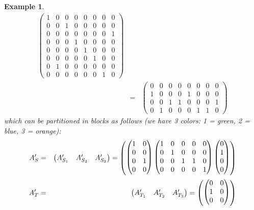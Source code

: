 \documentclass[a4paper,11pt]{report}
\newtheorem{example}[theorem]{Example}
\begin{document}
\begin{example}
\begin{eqnarray*}
\begin{pmatrix}
1&0&0&0&0&0&0&0\\
0&0&1&0&0&0&0&0\\
0&0&0&0&0&0&0&1\\
0&0&0&1&0&0&0&0\\
0&0&0&0&1&0&0&0\\
0&0&0&0&0&1&0&0\\
0&1&0&0&0&0&0&0\\
0&0&0&0&0&0&1&0
\end{pmatrix}\\  &=& \begin{pmatrix}
0&0&0&0&0&0&0&0\\
1&0&0&0&1&0&0&0\\
0&0&1&1&0&0&0&1\\
0&1&0&0&0&1&1&0
\end{pmatrix}
\end{eqnarray*}
which can be partitioned in blocks as follows (we have 3 colors: 1 = green, 2 = blue, 3 = orange):
\begin{eqnarray*}A'_S &=& \begin{pmatrix}
A'_{S_1} & A'_{S_2} & A'_{S_3}\\
\end{pmatrix} =
\begin{pmatrix}\smallskip
  \begin{pmatrix}
  1&0\\
0&0\\
0&1\\
0&0
\end{pmatrix}
\begin{pmatrix}
1&0&0&0&0\\
0&1&0&0&0\\
0&0&1&1&0\\
0&0&0&0&1
\end{pmatrix}
\begin{pmatrix}
0\\
1\\
0\\
0
\end{pmatrix}
\end{pmatrix}\\
A'_T &=& \begin{pmatrix}
A'_{T_1} & A'_{T_2} & A'_{T_3}\\
\end{pmatrix} =
\begin{pmatrix}\smallskip
  \begin{pmatrix}
0&0\\
1&0\\
0&0\\

\end{pmatrix}
\end{pmatrix}
\end{eqnarray*}
\end{example}
\end{document}
